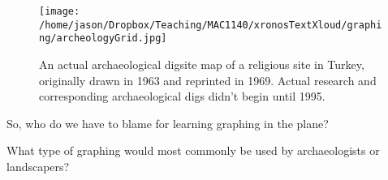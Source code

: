 \documentclass{ximeraXloud}
\begin{document}
        \begin{figure}[h]
            \begin{center}
                \texttt{[image: /home/jason/Dropbox/Teaching/MAC1140/xronosTextXloud/graphing/archeologyGrid.jpg]}
            \end{center}
            \caption{
                An actual archaeological digsite map of a religious site in Turkey, originally drawn in 1963 and reprinted in 1969. Actual research and corresponding archaeological digs didn't begin until 1995.
                }
            \label{gridMap}
        \end{figure}
        
    \begin{problem}
        So, who do we have to blame for learning graphing in the plane?
        \begin{multipleChoice}
        \end{multipleChoice}
    \end{problem}
    
    \begin{problem}
        What type of graphing would most commonly be used by archaeologists or landscapers?
        \begin{multipleChoice}
        \end{multipleChoice}
    \end{problem}
\end{document}
